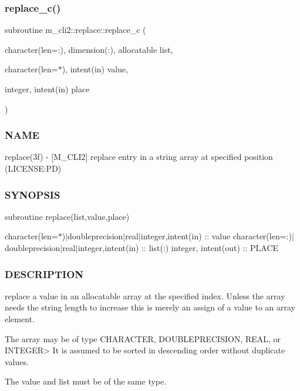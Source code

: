 \subsubsection{\texorpdfstring{replace\+\_\+c()}{replace\_c()}}
{\footnotesize\ttfamily subroutine m\+\_\+cli2\+::replace\+::replace\+\_\+c (\begin{DoxyParamCaption}\item[{character(len=\+:), dimension(\+:), allocatable}]{list,  }\item[{character(len=$\ast$), intent(in)}]{value,  }\item[{integer, intent(in)}]{place }\end{DoxyParamCaption})\hspace{0.3cm}{\ttfamily [private]}}



\subsubsection*{N\+A\+ME}

replace(3f) -\/ \mbox{[}M\+\_\+\+C\+L\+I2\mbox{]} replace entry in a string array at specified position (L\+I\+C\+E\+N\+SE\+:PD) 

\subsubsection*{S\+Y\+N\+O\+P\+S\+IS}

subroutine replace(list,value,place)

character(len=$\ast$)$\vert$doubleprecision$\vert$real$\vert$integer,intent(in) \+:\+: value character(len=\+:)$\vert$doubleprecision$\vert$real$\vert$integer,intent(in) \+:\+: list(\+:) integer, intent(out) \+:\+: P\+L\+A\+CE

\subsubsection*{D\+E\+S\+C\+R\+I\+P\+T\+I\+ON}

\begin{DoxyVerb}replace a value in an allocatable array at the specified index. Unless the
array needs the string length to increase this is merely an assign of a value
to an array element.

The array may be of type CHARACTER, DOUBLEPRECISION, REAL, or INTEGER>
It is assumed to be sorted in descending order without duplicate values.

The value and list must be of the same type.
\end{DoxyVerb}


